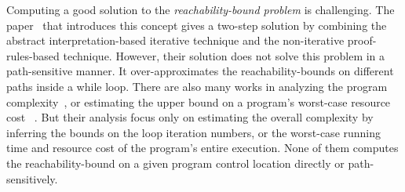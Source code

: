 Computing a good solution to the \emph{reachability-bound problem} is challenging.
The paper~\cite{GulwaniZ10} that introduces this concept
gives a two-step solution by combining the abstract interpretation-based iterative technique
and the non-iterative proof-rules-based technique.
However, their solution
does not solve this problem in a path-sensitive manner.
It over-approximates the reachability-bounds on different paths inside a while loop.
There are also many works in analyzing the program complexity~\cite{GustafssonEL05,HumenbergerJK18},
or estimating the upper bound on a program's worst-case resource cost
~\cite{BrockschmidtEFFG16,AlbertAGP08,AliasDFG10,Flores-MontoyaH14}.
But their analysis
focus only on estimating 
the overall complexity 
by inferring the bounds on the loop iteration numbers,
or the worst-case running time and resource cost of the program's entire execution.
None of them computes the reachability-bound on a given program control location directly or path-sensitively.

